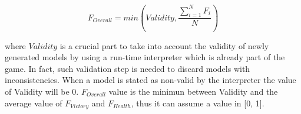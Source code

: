 \begin{equation}
	F_{Overall} = min \left (Validity, \frac{\sum\limits_{i=1}^{N}F_{i}}{N} \right )
\end{equation}

\noindent where $Validity$ is a crucial part to take into account the validity of  newly generated models by using a run-time interpreter which is already part of the game. In fact, such validation step is needed to discard models with inconsistencies. When a model is stated as non-valid by the interpreter the value of Validity will be 0.  $F_{Overall}$ value is the minimun between Validity and the average value of $F_{Victory}$ and $F_{Health}$, thus it can assume a value in [0, 1].





